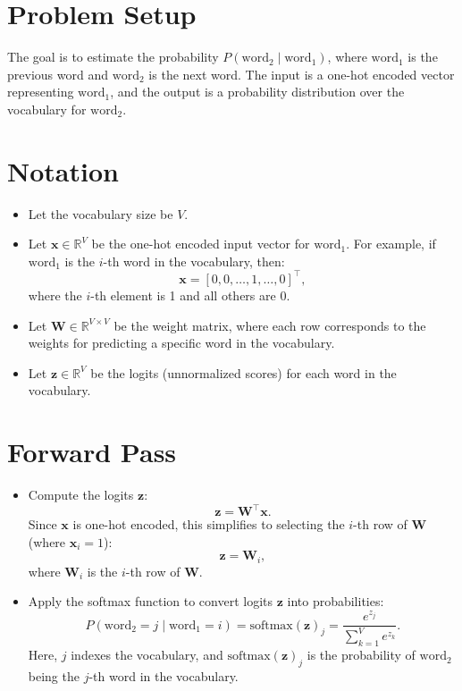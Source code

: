 \begin{notechapter}
\section{Problem Setup}
The goal is to estimate the probability \( P(\text{word}_2 \mid \text{word}_1) \),
where \(\text{word}_1\) is the previous word and \(\text{word}_2\) is the next
word. The input is a one-hot encoded vector representing \(\text{word}_1\), and
the output is a probability distribution over the vocabulary for \(\text{word}_2\).

\section{Notation}
\begin{itemize}
    \item Let the vocabulary size be \( V \).
    \item Let \(\mathbf{x} \in \mathbb{R}^V\) be the one-hot encoded input
          vector for \(\text{word}_1\). For example, if \(\text{word}_1\) is
          the \(i\)-th word in the vocabulary, then:
          \[
          \mathbf{x} = [0, 0, \dots, 1, \dots, 0]^\top,
          \]
          where the \(i\)-th element is 1 and all others are 0.
    \item Let \(\mathbf{W} \in \mathbb{R}^{V \times V}\) be the weight matrix,
          where each row corresponds to the weights for predicting a specific
          word in the vocabulary.
    \item Let \(\mathbf{z} \in \mathbb{R}^V\) be the logits (unnormalized
          scores) for each word in the vocabulary.
\end{itemize}

\section{Forward Pass}
\begin{itemize}
    \item Compute the logits \(\mathbf{z}\):
          \[
          \mathbf{z} = \mathbf{W}^\top \mathbf{x}.
          \]
          Since \(\mathbf{x}\) is one-hot encoded, this simplifies to selecting
          the \(i\)-th row of \(\mathbf{W}\) (where \(\mathbf{x}_i = 1\)):
          \[
          \mathbf{z} = \mathbf{W}_i,
          \]
          where \(\mathbf{W}_i\) is the \(i\)-th row of \(\mathbf{W}\).

    \item Apply the softmax function to convert logits \(\mathbf{z}\) into
          probabilities:
          \[
          P(\text{word}_2 = j \mid \text{word}_1 = i) =
          \text{softmax}(\mathbf{z})_j = \frac{e^{z_j}}{\sum_{k=1}^V e^{z_k}}.
          \]
          Here, \(j\) indexes the vocabulary, and
          \(\text{softmax}(\mathbf{z})_j\) is the probability of \(\text{word}_2\)
          being the \(j\)-th word in the vocabulary.
\end{itemize}


\end{notechapter}
